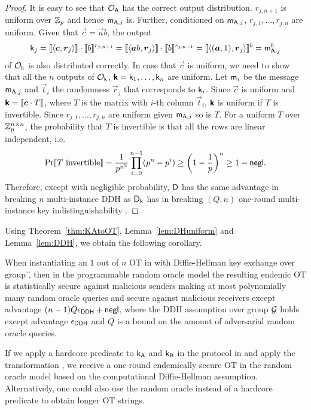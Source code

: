 \begin{proof}
It is easy to see that $\mathcal{O}_{\mathsf{A}}$ has the correct output distribution. $r_{j,n+1}$ is uniform over $\mathbb Z_p$ and hence $\mathsf{m}_{\mathsf{A},j}$ is. Further, conditioned on $\mathsf{m}_{\mathsf{A},j}$, $r_{j,1},\ldots,r_{j,n}$ are uniform. Given that $\vec{c}=\vec{a}b$, the output
$$
\key_j=\lb \langle\vec{c},\vec{r}_j\rangle\rb\cdot\lb b\rb^{r_{j,n+1}}=\lb \langle\vec{a}b,\vec{r}_j\rangle\rb\cdot\lb b\rb^{r_{j,n+1}}=\lb \langle(\vec{a},1),\vec{r}_j\rangle\rb^b=\mes_{\A,j}^b
$$
of $\mathcal{O}_{\mathsf{k}}$ is also distributed correctly. In case that $\vec{c}$ is uniform, we need to show that all the $n$ outputs of $\mathcal{O}_{\mathsf{k}}$, $\vec{\key}=\key_1,\ldots,\key_n$ are uniform. Let $\mathsf{m}_i$ be the message $\mathsf{m}_{\mathsf{A},j}$ and $\vec{t}_i$ the randomness $\vec{r}_j$ that corresponds to $\mathsf{k}_i$. Since $\vec{c}$ is uniform and $\vec{\key}=\lb \vec{c}\cdot T\rb$, where $T$ is the matrix with $i$-th column $\vec{t}_i$, $\vec{\key}$ is uniform if $T$ is invertible. Since $r_{j,1},\ldots,r_{j,n}$ are uniform given $\mathsf{m}_{\mathsf{A},j}$ so is $T$. For a uniform $T$ over $\mathbb Z_p^{n\times n}$, the probability that $T$ is invertible is that all the rows are linear independent, i.e. 
$$
\Pr\llbracket T\text{ invertible}\rrbracket= \frac{1}{p^{n^2}}\prod_{i=0}^{n-1}(p^n-p^i)\geq\left(1-\frac{1}{p}\right)^n\geq 1-\mathsf{negl}.
$$ 
Therefore, except with negligible probability, $\mathsf D$ has the same advantage in breaking $n$ multi-instance DDH as $\mathsf D_{\mathsf{k}}$ has in breaking $(Q,n)$ one-round multi-instance key indistinguishability .
\end{proof}

Using Theorem~\ref{thm:KAtoOT}, Lemma~\ref{lem:DHuniform} and Lemma~\ref{lem:DDH}, we obtain the following corollary.

\begin{corollary}
When instantiating an $1$ out of $n$ OT in  with Diffie-Hellman key exchange over group \G, then in the programmable random oracle model the resulting endemic OT is statistically secure against malicious senders making at most polynomially many random oracle queries and secure against malicious receivers except advantage $(n-1)Q\epsilon_{\mathsf{DDH}}+\mathsf{negl}$, where the DDH assumption over group $\mathcal{G}$ holds except advantage $\epsilon_{\mathsf{DDH}}$ and $Q$ is a bound on the amount of adversarial random oracle queries.
\end{corollary}

\begin{remark}
If we apply a hardcore predicate to $\mathsf{k}_{\mathsf{A}}$ and $\mathsf{k}_{\mathsf{B}}$ in the protocol in  and apply the transformation , we receive a one-round endemically secure OT in the random oracle model based on the computational Diffie-Hellman assumption. Alternatively, one could also use the random oracle instead of a hardcore predicate to obtain longer OT strings. 
\end{remark}

